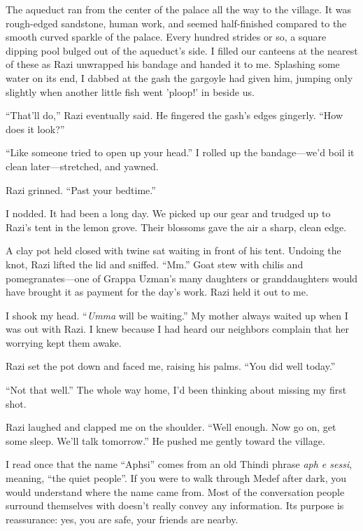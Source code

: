 The aqueduct ran from the center of the palace all the way to the
village.  It was rough-edged sandstone, human work, and seemed
half-finished compared to the smooth curved sparkle of the palace.
Every hundred strides or so, a square dipping pool bulged out of the
aqueduct's side.  I filled our canteens at the nearest of these as
Razi unwrapped his bandage and handed it to me.  Splashing some water
on its end, I dabbed at the gash the gargoyle had given him, jumping
only slightly when another little fish went 'ploop!' in beside us.

``That'll do,'' Razi eventually said.  He fingered the gash's edges
gingerly.  ``How does it look?''

``Like someone tried to open up your head.''  I rolled up the
bandage---we'd boil it clean later---stretched, and yawned.

Razi grinned.  ``Past your bedtime.''

I nodded.  It had been a long day.  We picked up our gear and trudged
up to Razi's tent in the lemon grove.  Their blossoms gave the air a
sharp, clean edge.

A clay pot held closed with twine sat waiting in front of his tent.
Undoing the knot, Razi lifted the lid and sniffed.  ``Mm.''  Goat stew
with chilis and pomegranates---one of Grappa Uzman's many daughters or
granddaughters would have brought it as payment for the day's work.
Razi held it out to me.

I shook my head.  ``\emph{Umma} will be waiting.''  My mother always waited
up when I was out with Razi.  I knew because I had heard our neighbors
complain that her worrying kept them awake.

Razi set the pot down and faced me, raising his palms.  ``You did well
today.''

``Not that well.''  The whole way home, I'd been thinking about missing
my first shot.

Razi laughed and clapped me on the shoulder.  ``Well enough.  Now go
on, get some sleep.  We'll talk tomorrow.''  He pushed me gently toward
the village.

I read once that the name ``Aphsi'' comes from an old Thindi phrase \emph{aph
e sessi}, meaning, ``the quiet people''.  If you were to walk through
Medef after dark, you would understand where the name came from.  Most
of the conversation people surround themselves with doesn't really
convey any information.  Its purpose is reassurance: yes, you are
safe, your friends are nearby.

